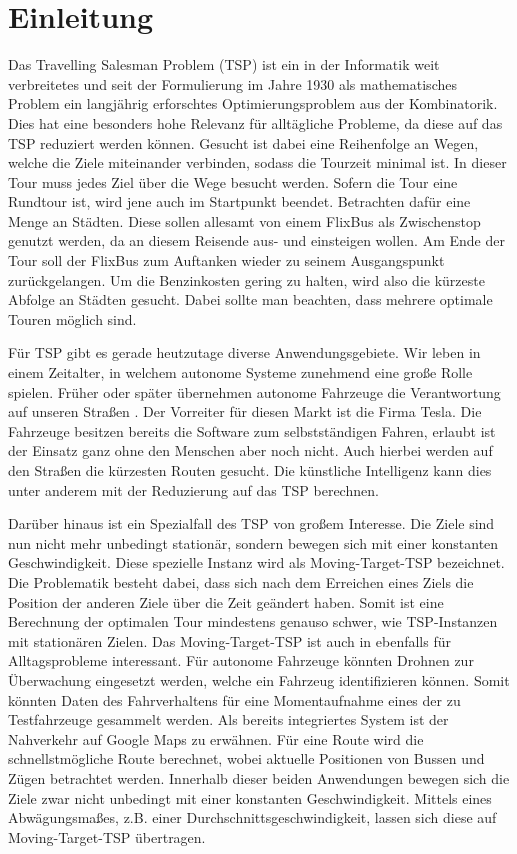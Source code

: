 \documentclass[german,version-2019-11]{uzl-thesis}
\begin{document}
\chapter{Einleitung}

Das Travelling Salesman Problem (TSP) ist ein in der Informatik weit verbreitetes und seit der Formulierung im Jahre 1930 als mathematisches Problem ein langjährig erforschtes Optimierungsproblem aus der Kombinatorik. Dies hat eine besonders hohe Relevanz für alltägliche Probleme, da diese auf das TSP reduziert werden können. Gesucht ist dabei eine Reihenfolge an Wegen, welche die Ziele miteinander verbinden, sodass die Tourzeit minimal ist. In dieser Tour muss jedes Ziel über die Wege besucht werden. Sofern die Tour eine Rundtour ist, wird jene auch im Startpunkt beendet. Betrachten dafür eine Menge an Städten. Diese sollen allesamt von einem FlixBus als Zwischenstop genutzt werden, da an diesem Reisende aus- und einsteigen wollen. Am Ende der Tour soll der FlixBus zum Auftanken wieder zu seinem Ausgangspunkt zurückgelangen. Um die Benzinkosten gering zu halten, wird also die kürzeste Abfolge an Städten gesucht. Dabei sollte man beachten, dass mehrere optimale Touren möglich sind. 

Für TSP gibt es gerade heutzutage diverse Anwendungsgebiete. Wir leben in einem Zeitalter, in welchem autonome Systeme zunehmend eine große Rolle spielen. Früher oder später übernehmen autonome Fahrzeuge die Verantwortung auf unseren Straßen \cite{minx2015autonomes}. Der Vorreiter für diesen Markt ist die Firma Tesla. Die Fahrzeuge besitzen bereits die Software zum selbstständigen Fahren, erlaubt ist der Einsatz ganz ohne den Menschen aber noch nicht. Auch hierbei werden auf den Straßen die kürzesten Routen gesucht. Die künstliche Intelligenz kann dies unter anderem mit der Reduzierung auf das TSP berechnen. 

Darüber hinaus ist ein Spezialfall des TSP von großem Interesse. Die Ziele sind nun nicht mehr unbedingt stationär, sondern bewegen sich mit einer konstanten Geschwindigkeit. Diese spezielle Instanz wird als Moving-Target-TSP bezeichnet. Die Problematik besteht dabei, dass sich nach dem Erreichen eines Ziels die Position der anderen Ziele über die Zeit geändert haben. Somit ist eine Berechnung der optimalen Tour mindestens genauso schwer, wie TSP-Instanzen mit stationären Zielen. Das Moving-Target-TSP ist auch in ebenfalls für Alltagsprobleme interessant. Für autonome Fahrzeuge könnten Drohnen zur Überwachung eingesetzt werden, welche ein Fahrzeug identifizieren können. Somit könnten Daten des Fahrverhaltens für eine Momentaufnahme eines der zu Testfahrzeuge gesammelt werden. Als bereits integriertes System ist der Nahverkehr auf Google Maps zu erwähnen. Für eine Route wird die schnellstmögliche Route berechnet, wobei aktuelle Positionen von Bussen und Zügen betrachtet werden. Innerhalb dieser beiden Anwendungen bewegen sich die Ziele zwar nicht unbedingt mit einer konstanten Geschwindigkeit. Mittels eines Abwägungsmaßes, z.B. einer Durchschnittsgeschwindigkeit, lassen sich diese auf Moving-Target-TSP übertragen. 
\end{document}
